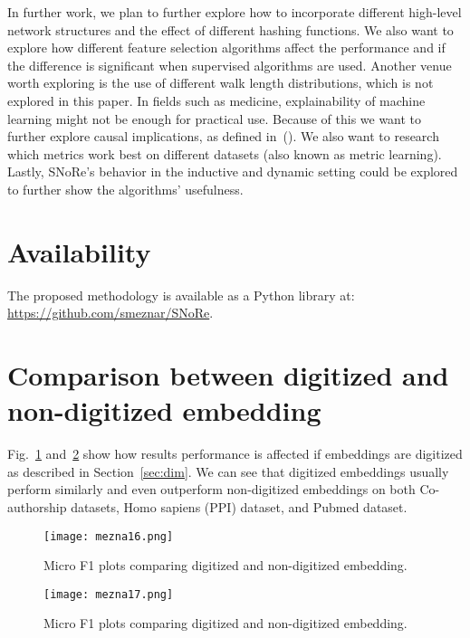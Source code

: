 \documentclass[twoside,11pt]{article}
\begin{document}
In further work, we plan to further explore how to incorporate different high-level network structures and the effect of different hashing functions. We also want to explore how different feature selection algorithms affect the performance and if the difference is significant when supervised algorithms are used. Another venue worth exploring is the use of different walk length distributions, which is not explored in this paper. In fields such as medicine, explainability of machine learning might not be enough for practical use. Because of this we want to further explore causal implications, as defined in~(\cite{Holzinger2019Causability}). We also want to research which metrics work best on different datasets (also known as metric learning). Lastly, SNoRe's behavior in the inductive and dynamic setting could be explored to further show the algorithms' usefulness.

\section*{Availability}
\label{sec:availability}
The proposed methodology is available as a Python library at: \url{https://github.com/smeznar/SNoRe}.

{}


\appendix

\section{Comparison between digitized and non-digitized embedding}
\label{sec:app-dig}
Fig.~\ref{fig:microdigitized} and~\ref{fig:macrodigitized} show how results performance is affected if embeddings are digitized as described in Section~\ref{sec:dim}. We can see that digitized embeddings usually perform similarly and even outperform non-digitized embeddings on both Co-authorship datasets, Homo sapiens (PPI) dataset, and Pubmed dataset.

\begin{figure}[t!]
  \centering
  \texttt{[image: mezna16.png]}
  \caption{Micro F1 plots comparing digitized and non-digitized embedding.}
  \label{fig:microdigitized}
\end{figure}

\begin{figure}[t!]
  \centering
  \texttt{[image: mezna17.png]}
  \caption{Micro F1 plots comparing digitized and non-digitized embedding.}
  \label{fig:macrodigitized}
\end{figure}
\end{document}
